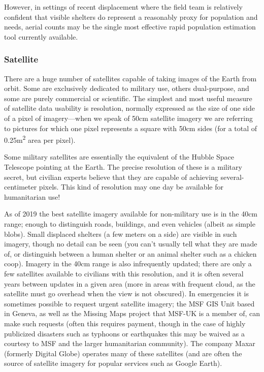 \documentclass[a4paper,12pt,twoside]{article}
\begin{document}
However, in settings of recent displacement where the field team is relatively confident that visible shelters do represent a reasonably proxy for population and needs, aerial counts may be the single most effective rapid population estimation tool currently available. 

\subsubsection{Satellite}
There are a huge number of satellites capable of taking images of the Earth from orbit. Some are exclusively dedicated to military use, others dual-purpose, and some are purely commercial or scientific. The simplest and most useful measure of satellite data usability is resolution, normally expressed as the size of one side of a pixel of imagery—when we speak of 50cm satellite imagery we are referring to pictures for which one pixel represents a square with 50cm sides (for a total of 0.25m\textsuperscript{2} area per pixel). 

Some military satellites are essentially the equivalent of the Hubble Space Telescope pointing at the Earth. The precise resolution of these is a military secret, but civilian experts believe that they are capable of achieving several-centimeter pixels. This kind of resolution may one day be available for humanitarian use!

As of 2019 the best satellite imagery available for non-military use is in the 40cm range; enough to distinguish roads, buildings, and even vehicles (albeit as simple blobs). Small displaced shelters (a few meters on a side) are visible in such imagery, though no detail can be seen (you can't usually tell what they are made of, or distinguish between a human shelter or an animal shelter such as a chicken coop). Imagery in the 40cm range is also infrequently updated; there are only a few satellites available to civilians with this resolution, and it is often several years between updates in a given area (more in areas with frequent cloud, as the satellite must go overhead when the view is not obscured). In emergencies it is sometimes possible to request urgent satellite imagery; the MSF GIS Unit based in Geneva, as well as the Missing Maps project that MSF-UK is a member of, can make such requests (often this requires payment, though in the case of highly publicized disasters such as typhoons or earthquakes this may be waived as a courtesy to MSF and the larger humanitarian community). The company Maxar (formerly Digital Globe) operates many of these satellites (and are often the source of satellite imagery for popular services such as Google Earth).
\end{document}
